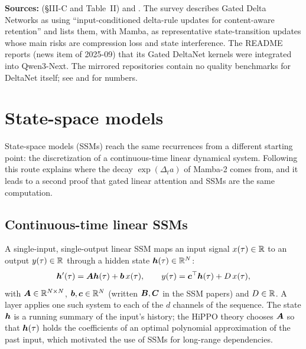 \begin{results}
\textbf{Sources:} \citet{zhoubian2026memory} (\S III-C and Table~II) and
. The survey describes Gated Delta
Networks as using ``input-conditioned delta-rule updates for content-aware retention'' and lists
them, with Mamba, as representative state-transition updates whose main risks are compression
loss and state interference. The \fla{} README reports (news item of 2025-09) that its Gated
DeltaNet kernels were integrated into Qwen3-Next. The mirrored repositories contain no quality
benchmarks for DeltaNet itself; see \citet{c02-yang2024deltanet} and \citet{yang2025gdn} for
numbers.
\end{results}

\section{State-space models}\label{sec:c03-ssm}

State-space models (SSMs) reach the same recurrences from a different starting point: the
discretization of a continuous-time linear dynamical system. Following this route explains
where the decay $\exp(\Delta_t a)$ of Mamba-2 comes from, and it leads to a second proof that
gated linear attention and SSMs are the same computation.

\subsection{Continuous-time linear SSMs}

A single-input, single-output linear SSM maps an input signal $x(\tau)\in\mathbb{R}$ to an output
$y(\tau)\in\mathbb{R}$ through a hidden state $\bm{h}(\tau)\in\mathbb{R}^{N}$:
\begin{equation}\label{eq:c03-ssm-ct}
  \bm{h}'(\tau)=\bm{A}\bm{h}(\tau)+\bm{b}\,x(\tau),\qquad y(\tau)=\bm{c}^{\top}\bm{h}(\tau)+D\,x(\tau),
\end{equation}
with $\bm{A}\in\mathbb{R}^{N\times N}$, $\bm{b},\bm{c}\in\mathbb{R}^N$ (written $\bm{B},\bm{C}$ in the SSM papers) and
$D\in\mathbb{R}$. A layer applies one such system to each of the $d$ channels of the sequence. The state
$\bm{h}$ is a running summary of the input's history; the HiPPO theory
\citep{c03-gu2020hippo} chooses $\bm{A}$ so that $\bm{h}(\tau)$ holds the coefficients of an optimal
polynomial approximation of the past input, which motivated the use of SSMs for long-range
dependencies.

